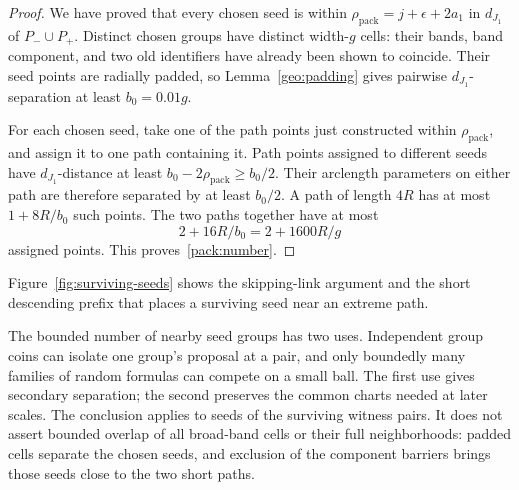 \begin{proof}
We have proved that every chosen seed is within
$\rho_{\mathrm{pack}}=j+\epsilon+2a_1$ in $d_{J_1}$ of
$P_-\cup P_+$.  Distinct chosen groups have distinct width-$g$
cells: their bands, band component, and two old identifiers
have already been shown to coincide.  Their seed points are
radially padded, so Lemma~\ref{geo:padding} gives pairwise
$d_{J_1}$-separation at least $b_0=0.01g$.

For each chosen seed, take one of the path points just
constructed within $\rho_{\mathrm{pack}}$, and assign it to one path
containing it.  Path points assigned to different seeds have
$d_{J_1}$-distance at least $b_0-2\rho_{\mathrm{pack}}\ge b_0/2$.
Their arclength parameters on either path are therefore
separated by at least $b_0/2$.  A path of length $4R$ has at
most $1+8R/b_0$ such points.  The two paths together have at
most
\[
 2+16R/b_0=2+1600R/g
\]
assigned points.  This proves~\eqref{pack:number}.
\end{proof}

Figure~\ref{fig:surviving-seeds} shows the skipping-link argument and the
short descending prefix that places a surviving seed near an extreme path.



\begin{remark}
\label{pack:purpose}
The bounded number of nearby seed groups has two uses. Independent
group coins can isolate one group's proposal at a pair, and only
boundedly many families of random formulas can compete on a small ball.
The first use gives secondary separation; the second preserves the
common charts needed at later scales. The conclusion applies to seeds
of the surviving witness pairs. It does not assert bounded overlap of
all broad-band cells or their full neighborhoods: padded cells separate
the chosen seeds, and exclusion of the component barriers brings those
seeds close to the two short paths.
\end{remark}
